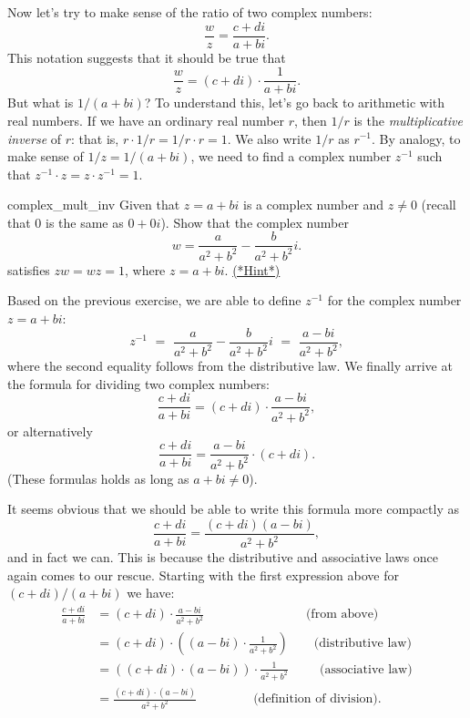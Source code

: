 Now let's try to make sense of the ratio of two complex numbers: 
\[\frac{w}{z}=\frac{c+di} {a+bi}.\] 
This notation suggests that it should be true that  
\[\frac{w}{z}=(c+di)  \cdot \frac{1}{a+bi}. \]
 But what is $1/(a+bi)$?
To understand this, let's go back to arithmetic with real numbers. If we have an ordinary real number $r$, then $1/r$ is the \emph{multiplicative inverse} of $r$: that is, $r \cdot 1/r =1/r \cdot r = 1$. We also write $1/r$ as $r^{-1}$. By analogy, to make sense of $1/z = 1/(a+bi)$, we need to find a complex number $z^{-1}$ such that $z^{-1} \cdot z = z \cdot z^{-1} = 1$.

\begin{exercise}{complex_mult_inv}  Given that $z = a+bi$ is a complex number and $z \neq 0$ (recall that $0$ is the same as $0+0i$).  Show that the complex number
\[w=\frac{a}{a^{2}+b^{2}}- \frac{b}{a^{2}+b^{2}}i.\]
satisfies $zw=wz=1$, where $z=a+bi$.
\hyperref[sec:complex:hints]{(*Hint*)}
\end{exercise}
Based on the previous exercise, we are able to define $z^{-1}$ for the complex number $z = a+bi$:
\[ z^{-1}\,\, =\,\, \frac{a}{a^{2}+b^{2}}- \frac{b}{a^{2}+b^{2}}i \,\, =\,\, \frac{a-bi}{a^{2} + b^{2}},\]
where the second equality follows from the distributive law. We
 finally arrive at the formula for dividing two complex numbers:
\[\frac{c+di}{a+bi}=
(c + di) \cdot \frac{a-bi}{a^2 + b^2}, \]
or alternatively
\[\frac{c+di}{a+bi}=  \frac{a-bi}{a^2 + b^2} \cdot (c + di).\]
(These formulas holds as long as $a+bi \neq 0$). 

It seems obvious that we should be able to write this formula more compactly as
\[\frac{c+di}{a+bi}=
 \frac{(c+di)(a-bi)}{a^2 + b^2}, \]
and in fact we can. This is because the distributive and associative laws once again comes to our rescue. Starting with the first expression above for $(c + di) / (a + bi)$ we have:
\begin{align*}
\frac{c+di}{a+bi}&=
(c + di) \cdot \frac{a-bi}{a^2 + b^2} \qquad \qquad \qquad  \qquad \textrm{(from above)}\\
& = (c + di) \cdot \left( (a-bi) \cdot \frac{1}{a^2 + b^2}\right) \qquad \textrm{(distributive law)}\\
& = ((c + di) \cdot  (a-bi)) \cdot \frac{1}{a^2 + b^2} \qquad ~~\textrm{(associative law)}\\
& = \frac{(c + di) \cdot  (a-bi)}{a^2 + b^2} \qquad \qquad ~~\textrm{(definition of division).}\\
\end{align*}

